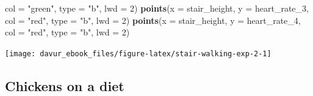 \documentclass[]{book}
\newenvironment{Shaded}{\begin{snugshade}}{\end{snugshade}}
\newcommand{\DataTypeTok}[1]{\textcolor[rgb]{0.13,0.29,0.53}{#1}}
\newcommand{\DecValTok}[1]{\textcolor[rgb]{0.00,0.00,0.81}{#1}}
\newcommand{\KeywordTok}[1]{\textcolor[rgb]{0.13,0.29,0.53}{\textbf{#1}}}
\newcommand{\NormalTok}[1]{#1}
\newcommand{\StringTok}[1]{\textcolor[rgb]{0.31,0.60,0.02}{#1}}
\begin{document}
\begin{Shaded}
\begin{Highlighting}[]
    \DataTypeTok{col =} \StringTok{"green"}\NormalTok{,}
    \DataTypeTok{type =} \StringTok{"b"}\NormalTok{,}
    \DataTypeTok{lwd =} \DecValTok{2}\NormalTok{)}
\KeywordTok{points}\NormalTok{(}\DataTypeTok{x =}\NormalTok{ stair_height,}
    \DataTypeTok{y =}\NormalTok{ heart_rate_}\DecValTok{3}\NormalTok{,}
    \DataTypeTok{col =} \StringTok{"red"}\NormalTok{,}
    \DataTypeTok{type =} \StringTok{"b"}\NormalTok{,}
    \DataTypeTok{lwd =} \DecValTok{2}\NormalTok{)}
\KeywordTok{points}\NormalTok{(}\DataTypeTok{x =}\NormalTok{ stair_height,}
    \DataTypeTok{y =}\NormalTok{ heart_rate_}\DecValTok{4}\NormalTok{,}
    \DataTypeTok{col =} \StringTok{"red"}\NormalTok{,}
    \DataTypeTok{type =} \StringTok{"b"}\NormalTok{,}
    \DataTypeTok{lwd =} \DecValTok{2}\NormalTok{)}
\end{Highlighting}
\end{Shaded}

\begin{center}\texttt{[image: davur\_ebook\_files/figure-latex/stair-walking-exp-2-1]} \end{center}

\hypertarget{chickens-on-a-diet-1}{%
\subsection{Chickens on a diet}\label{chickens-on-a-diet-1}}
\end{document}
